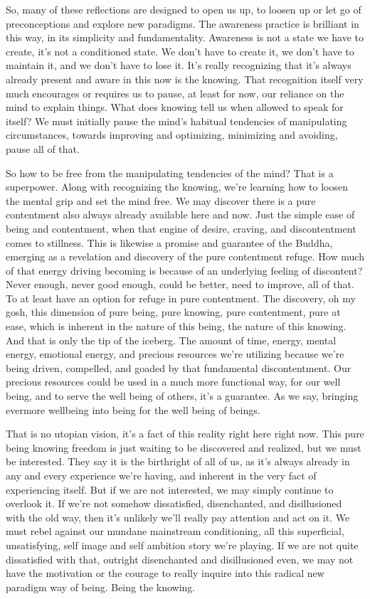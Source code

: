 \documentclass[12pt,openany]{book}
\begin{document}
So, many of these reflections are designed to open us up, to loosen up or let go of preconceptions and explore new paradigms. The awareness practice is brilliant in this way, in its simplicity and fundamentality. Awareness is not a state we have to create, it's not a conditioned state. We don't have to create it, we don't have to maintain it, and we don't have to lose it. It's really recognizing that it's always already present and aware in this now is the knowing. That recognition itself very much encourages or requires us to pause, at least for now, our reliance on the mind to explain things. What does knowing tell us when allowed to speak for itself? We must initially pause the mind's habitual tendencies of manipulating circumstances, towards improving and optimizing, minimizing and avoiding, pause all of that.

So how to be free from the manipulating tendencies of the mind? That is a superpower. Along with recognizing the knowing, we're \linebreak learning how to loosen the mental grip and set the mind free. We may discover there is a pure contentment also always already available here and now. Just the simple ease of being and contentment, when that engine of desire, craving, and discontentment comes to stillness. This is likewise a promise and guarantee of the Buddha, emerging as a revelation and discovery of the pure contentment refuge. How much of that energy driving becoming is because of an underlying feeling of discontent? Never enough, never good enough, could be better, need to improve, all of that. To at least have an option for refuge in pure contentment. The discovery, oh my gosh, this dimension of pure being, pure knowing, pure contentment, pure at ease, which is inherent in the nature of this being, the nature of this knowing. And that is only the tip of the iceberg. The amount of time, energy, mental energy, emotional energy, and precious resources we're utilizing because we're being driven, compelled, and goaded by that fundamental discontentment. Our precious resources could be used in a much more functional way, for our well being, and to serve the well being of others, it's a guarantee. As we say, bringing evermore wellbeing into being for the well being of beings.

That is no utopian vision, it's a fact of this reality right here right now. This pure being knowing freedom is just waiting to be discovered and realized, but we must be interested. They say it is the birth\-right of all of us, as it's always already in any and every experience we're having, and inherent in the very fact of experiencing itself. But if we are not interested, we may simply continue to overlook it. If we're not somehow dissatisfied, disenchanted, and disillusioned with the old way, then it's unlikely we'll really pay attention and act on it. We must rebel against our mundane mainstream conditioning, all this superficial, unsatisfying,  self image and self ambition story we're playing. If we are not quite dissatisfied with that, outright disenchanted and disillusioned even, we may not have the motivation or the courage to really inquire into this radical new paradigm way of being. Being the knowing.
\end{document}
